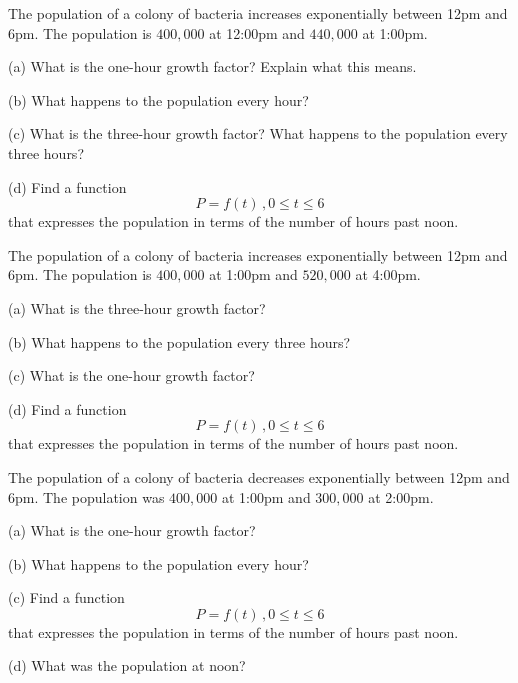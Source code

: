 \documentclass{ximera}
\begin{document}
\begin{question}   \label{Q4:ExponentialG}
The population of a colony of bacteria increases exponentially between 12pm and 6pm. The population is $400,000$ at 12:00pm and $440,000$ at 1:00pm. 

(a) What is the one-hour growth factor? Explain what this means.

(b) What happens to the population every hour?

(c) What is the three-hour growth factor? What happens to the population every three hours?

(d) Find a function 
\[
     P = f(t) \, , 0\leq t \leq 6 
\]
that expresses the population in terms of the number of hours past noon.

\end{question}


\begin{question}   \label{Q5:ExponentialG}
The population of a colony of bacteria increases exponentially between 12pm and 6pm. The population is $400,000$ at 1:00pm and $520,000$ at 4:00pm. 

(a) What is the three-hour growth factor?

(b) What happens to the population every three hours?

(c) What is the one-hour growth factor?

(d) Find a function 
\[
     P = f(t) \, , 0\leq t \leq 6 
\]
that expresses the population in terms of the number of hours past noon.

\end{question}



\begin{question}   \label{Q5:ExdsfderdflG}
The population of a colony of bacteria decreases exponentially between 12pm and 6pm. The population was $400,000$ at 1:00pm and $300,000$ at 2:00pm. 

(a) What is the one-hour growth factor?

(b) What happens to the population every hour?

(c) Find a function 
\[
     P = f(t) \, , 0\leq t \leq 6 
\]
that expresses the population in terms of the number of hours past noon.

(d) What was the population at noon?

\end{question}
\end{document}
